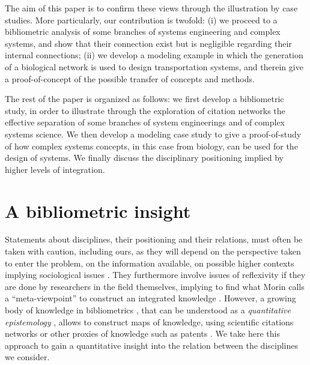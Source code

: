 \documentclass[runningheads,a4paper]{llncs}
\begin{document}
The aim of this paper is to confirm these views through the illustration by case studies. More particularly, our contribution is twofold: (i) we proceed to a bibliometric analysis of some branches of systems engineering and complex systems, and show that their connection exist but is negligible regarding their internal connections; (ii) we develop a modeling example in which the generation of a biological network is used to design transportation systems, and therein give a proof-of-concept of the possible transfer of concepts and methods.


The rest of the paper is organized as follows: we first develop a bibliometric study, in order to illustrate through the exploration of citation networks the effective separation of some branches of system engineerings and of complex systems science. We then develop a modeling case study to give a proof-of-study of how complex systems concepts, in this case from biology, can be used for the design of systems. We finally discuss the disciplinary positioning implied by higher levels of integration.



\section{A bibliometric insight}


Statements about disciplines, their positioning and their relations, must often be taken with caution, including ours, as they will depend on the perspective taken to enter the problem, on the information available, on possible higher contexts implying sociological issues \cite{latour1977rhetorique}. They furthermore involve issues of reflexivity if they are done by researchers in the field themselves, implying to find what Morin calls a ``meta-viewpoint'' to construct an integrated knowledge \cite{edgar1986methode}. However, a growing body of knowledge in bibliometrics \cite{waltman2010unified}, that can be understood as a \emph{quantitative epistemology} \cite{chavalarias2013phylomemetic}, allows to construct maps of knowledge, using scientific citations networks or other proxies of knowledge such as patents \cite{bergeaud2017classifying}. We take here this approach to gain a quantitative insight into the relation between the disciplines we consider.
\end{document}
